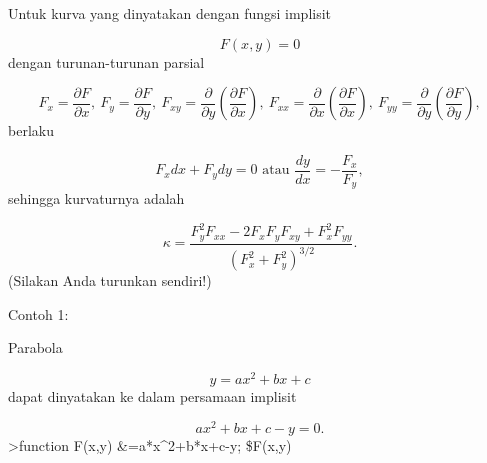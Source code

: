 \documentclass[
]{book}
\begin{document}
Untuk kurva yang dinyatakan dengan fungsi implisit

\[F(x,y)=0\]dengan turunan-turunan parsial

\[F_x=\frac{\partial F}{\partial x},\ F_y=\frac{\partial F}{\partial y},\ F_{xy}=\frac{\partial}{\partial y}\left(\frac{\partial F}{\partial x}\right),\ F_{xx}=\frac{\partial}{\partial x}\left(\frac{\partial F}{\partial x}\right),\ F_{yy}=\frac{\partial}{\partial y}\left(\frac{\partial F}{\partial y}\right),\]berlaku

\[F_x dx+ F_y dy = 0\text{ atau } \frac{dy}{dx}=-\frac{F_x}{F_y},\]sehingga kurvaturnya adalah

\[\kappa =\frac {F_y^2F_{xx}-2F_xF_yF_{xy}+F_x^2F_{yy}}{\left(F_x^2+F_y^2\right)^{3/2}}.\](Silakan Anda turunkan sendiri!)

Contoh 1:

Parabola

\[y=ax^2+bx+c\]dapat dinyatakan ke dalam persamaan implisit

\[ax^2+bx+c-y=0.\]\textgreater function F(x,y) \&=a*x\^{}2+b*x+c-y; \$F(x,y)
\end{document}
